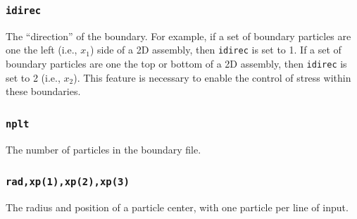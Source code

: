 \documentclass[letterpaper,11pt]{article}
\begin{document}
\subsubsection[\texttt{idirec}]{\texttt{idirec}}%
\label{sec:pb3}
The ``direction'' of the boundary.  For example, if a set of boundary 
particles are one the left (i.e., $x_{1}$) side of a 2D assembly, 
then \texttt{idirec} is set to 1.  If a set of boundary
particles are one the top or bottom of a 2D assembly, 
then \texttt{idirec} is set to 2 (i.e., $x_{2}$).
This feature is necessary to enable the control of stress within these
boundaries.
%
\subsubsection[\texttt{nplt}]{\texttt{nplt}}%
\label{sec:pb4}
The number of particles in the boundary file.
%
\subsubsection[\texttt{rad,xp(1)}]{\texttt{rad,xp(1),xp(2),xp(3)}}%
\label{sec:pb5}
The radius and position of a particle center, with one particle per line
of input.
%
\end{document}
